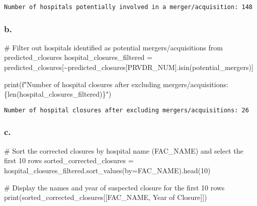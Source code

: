 \documentclass[
  letterpaper,
  DIV=11,
  numbers=noendperiod]{scrartcl}
\newenvironment{Shaded}{\begin{snugshade}}{\end{snugshade}}
\newcommand{\BuiltInTok}[1]{\textcolor[rgb]{0.00,0.23,0.31}{#1}}
\newcommand{\CommentTok}[1]{\textcolor[rgb]{0.37,0.37,0.37}{#1}}
\newcommand{\DecValTok}[1]{\textcolor[rgb]{0.68,0.00,0.00}{#1}}
\newcommand{\NormalTok}[1]{\textcolor[rgb]{0.00,0.23,0.31}{#1}}
\newcommand{\OperatorTok}[1]{\textcolor[rgb]{0.37,0.37,0.37}{#1}}
\newcommand{\SpecialCharTok}[1]{\textcolor[rgb]{0.37,0.37,0.37}{#1}}
\newcommand{\SpecialStringTok}[1]{\textcolor[rgb]{0.13,0.47,0.30}{#1}}
\newcommand{\StringTok}[1]{\textcolor[rgb]{0.13,0.47,0.30}{#1}}
\begin{document}
\begin{verbatim}
Number of hospitals potentially involved in a merger/acquisition: 148
\end{verbatim}

\subsubsection{b.}\label{b.}

\begin{Shaded}
\begin{Highlighting}[]
\CommentTok{\# Filter out hospitals identified as potential mergers/acquisitions from predicted\_closures}
\NormalTok{hospital\_closures\_filtered }\OperatorTok{=}\NormalTok{ predicted\_closures[}\OperatorTok{\textasciitilde{}}\NormalTok{predicted\_closures[}\StringTok{\textquotesingle{}PRVDR\_NUM\textquotesingle{}}\NormalTok{].isin(potential\_mergers)]}

\BuiltInTok{print}\NormalTok{(}\SpecialStringTok{f"Number of hospital closures after excluding mergers/acquisitions: }\SpecialCharTok{\{}\BuiltInTok{len}\NormalTok{(hospital\_closures\_filtered)}\SpecialCharTok{\}}\SpecialStringTok{"}\NormalTok{)}
\end{Highlighting}
\end{Shaded}

\begin{verbatim}
Number of hospital closures after excluding mergers/acquisitions: 26
\end{verbatim}

\subsubsection{c.}\label{c.}

\begin{Shaded}
\begin{Highlighting}[]
\CommentTok{\# Sort the corrected closures by hospital name (FAC\_NAME) and select the first 10 rows}
\NormalTok{sorted\_corrected\_closures }\OperatorTok{=}\NormalTok{ hospital\_closures\_filtered.sort\_values(by}\OperatorTok{=}\StringTok{\textquotesingle{}FAC\_NAME\textquotesingle{}}\NormalTok{).head(}\DecValTok{10}\NormalTok{)}

\CommentTok{\# Display the names and year of suspected closure for the first 10 rows}
\BuiltInTok{print}\NormalTok{(sorted\_corrected\_closures[[}\StringTok{\textquotesingle{}FAC\_NAME\textquotesingle{}}\NormalTok{, }\StringTok{\textquotesingle{}Year of Closure\textquotesingle{}}\NormalTok{]])}
\end{Highlighting}
\end{Shaded}
\end{document}
